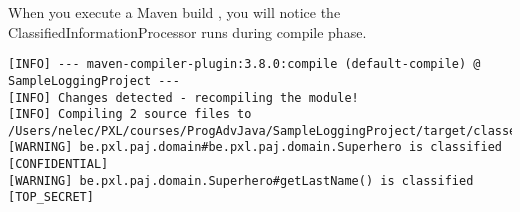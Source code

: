 When you execute a Maven build ,  you will notice the ClassifiedInformationProcessor runs during compile phase.


\begin{verbatim}
[INFO] --- maven-compiler-plugin:3.8.0:compile (default-compile) @ SampleLoggingProject ---
[INFO] Changes detected - recompiling the module!
[INFO] Compiling 2 source files to /Users/nelec/PXL/courses/ProgAdvJava/SampleLoggingProject/target/classes
[WARNING] be.pxl.paj.domain#be.pxl.paj.domain.Superhero is classified [CONFIDENTIAL]
[WARNING] be.pxl.paj.domain.Superhero#getLastName() is classified [TOP_SECRET]
\end{verbatim}

